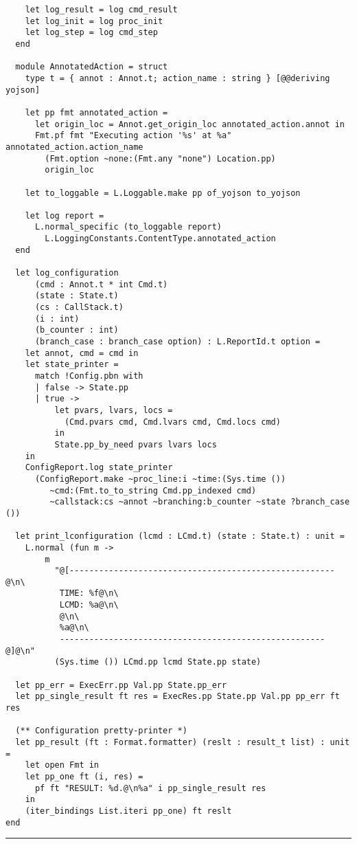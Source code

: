 \begin{verbatim}
    let log_result = log cmd_result
    let log_init = log proc_init
    let log_step = log cmd_step
  end

  module AnnotatedAction = struct
    type t = { annot : Annot.t; action_name : string } [@@deriving yojson]

    let pp fmt annotated_action =
      let origin_loc = Annot.get_origin_loc annotated_action.annot in
      Fmt.pf fmt "Executing action '%s' at %a" annotated_action.action_name
        (Fmt.option ~none:(Fmt.any "none") Location.pp)
        origin_loc

    let to_loggable = L.Loggable.make pp of_yojson to_yojson

    let log report =
      L.normal_specific (to_loggable report)
        L.LoggingConstants.ContentType.annotated_action
  end

  let log_configuration
      (cmd : Annot.t * int Cmd.t)
      (state : State.t)
      (cs : CallStack.t)
      (i : int)
      (b_counter : int)
      (branch_case : branch_case option) : L.ReportId.t option =
    let annot, cmd = cmd in
    let state_printer =
      match !Config.pbn with
      | false -> State.pp
      | true ->
          let pvars, lvars, locs =
            (Cmd.pvars cmd, Cmd.lvars cmd, Cmd.locs cmd)
          in
          State.pp_by_need pvars lvars locs
    in
    ConfigReport.log state_printer
      (ConfigReport.make ~proc_line:i ~time:(Sys.time ())
         ~cmd:(Fmt.to_to_string Cmd.pp_indexed cmd)
         ~callstack:cs ~annot ~branching:b_counter ~state ?branch_case ())

  let print_lconfiguration (lcmd : LCmd.t) (state : State.t) : unit =
    L.normal (fun m ->
        m
          "@[------------------------------------------------------@\n\
           TIME: %f@\n\
           LCMD: %a@\n\
           @\n\
           %a@\n\
           ------------------------------------------------------@]@\n"
          (Sys.time ()) LCmd.pp lcmd State.pp state)

  let pp_err = ExecErr.pp Val.pp State.pp_err
  let pp_single_result ft res = ExecRes.pp State.pp Val.pp pp_err ft res

  (** Configuration pretty-printer *)
  let pp_result (ft : Format.formatter) (reslt : result_t list) : unit =
    let open Fmt in
    let pp_one ft (i, res) =
      pf ft "RESULT: %d.@\n%a" i pp_single_result res
    in
    (iter_bindings List.iteri pp_one) ft reslt
end
\end{verbatim}
\vspace{-0.4cm}
\noindent\rule{\textwidth}{0.5pt}
\vspace{-0.6cm}
%
\label{lst:interpreter-logging}

